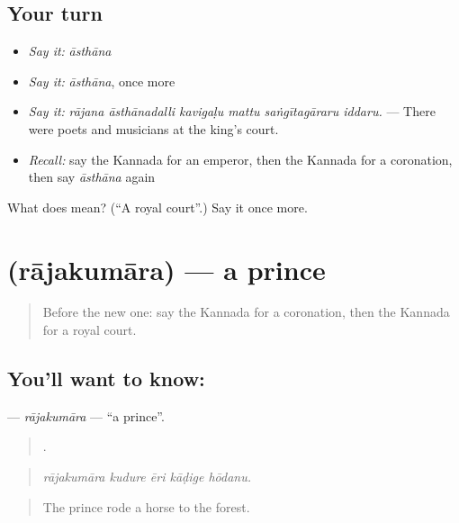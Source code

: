 \subsection*{Your turn}
\begin{itemize}
\raggedright
  \item \emph{Say it:} \emph{āsthāna}
  \item \emph{Say it:} \emph{āsthāna}, once more
  \item \emph{Say it:} \emph{rājana āsthānadalli kavigaḷu mattu saṅgītagāraru iddaru.} — There were poets and musicians at the king's court.
  \item \emph{Recall:} say the Kannada for an emperor, then the Kannada for a coronation, then say \emph{āsthāna} again
\end{itemize}

\begin{tcolorbox}[breakable,colback=teal!4,colframe=teal!35!black,title={Before you move on}]
What does  mean? (\textquotedblleft{}A royal court\textquotedblright{}.) Say it once more.
\end{tcolorbox}
\section[\texorpdfstring{\kn{ರಾಜಕುಮಾರ} (rājakumāra)}{ರಾಜಕುಮಾರ (rājakumāra)}]{ (rājakumāra) — a prince}

\label{lesson:KA-C354-rajakumara}



\begin{quote}
Before the new one: say the Kannada for a coronation, then the Kannada for a royal court.
\end{quote}

\subsection*{You'll want to know: }
\textbf{} — \emph{rājakumāra} — \textquotedblleft{}a prince\textquotedblright{}.

\begin{quote}
    .
\end{quote}

\begin{quote}
\emph{rājakumāra kudure ēri kāḍige hōdanu.}
\end{quote}

\begin{quote}
The prince rode a horse to the forest.
\end{quote}

